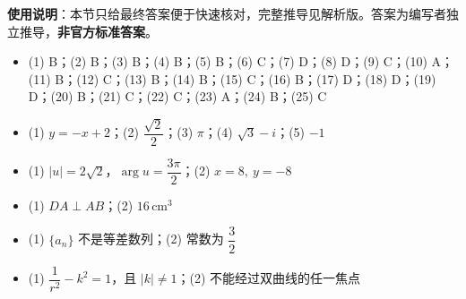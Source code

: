 
\begin{gknotice}
\textbf{使用说明}：本节只给最终答案便于快速核对，完整推导见解析版。答案为编写者独立推导，\textbf{非官方标准答案}。
\end{gknotice}

\begin{itemize}[leftmargin=2.6em]
  \item[\textbf{1.}] (1) B；(2) B；(3) B；(4) B；(5) B；(6) C；(7) D；(8) D；(9) C；(10) A；(11) B；(12) C；(13) B；(14) B；(15) C；(16) B；(17) D；(18) D；(19) D；(20) B；(21) C；(22) C；(23) A；(24) B；(25) C
  \item[\textbf{2.}] (1) $y=-x+2$；(2) $\dfrac{\sqrt2}{2}$；(3) $\pi$；(4) $\sqrt3-i$；(5) $-1$
  \item[\textbf{3.}] (1) $|u|=2\sqrt2$，$\arg u=\dfrac{3\pi}{2}$；(2) $x=8,\ y=-8$
  \item[\textbf{4.}] (1) $DA\perp AB$；(2) $16\,\mathrm{cm}^3$
  \item[\textbf{5.}] (1) $\{a_n\}$ 不是等差数列；(2) 常数为 $\dfrac32$
  \item[\textbf{6.}] (1) $\dfrac1{r^2}-k^2=1$，且 $|k|\ne1$；(2) 不能经过双曲线的任一焦点
\end{itemize}
